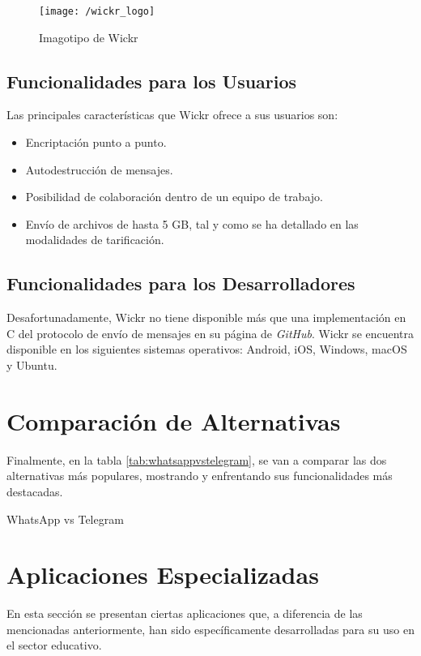 \begin{figure}[!h]
	\begin{center}
		\texttt{[image: /wickr\_logo]}
		\caption{Imagotipo de Wickr}
		\label{fig:wickr}
	\end{center}
\end{figure}

\subsection{Funcionalidades para los Usuarios}
Las principales características que Wickr ofrece a sus usuarios son:

\begin{itemize}
	\item Encriptación punto a punto.
	\item Autodestrucción de mensajes.
	\item Posibilidad de colaboración dentro de un equipo de trabajo.
	\item Envío de archivos de hasta 5 \acs{GB}, tal y como se ha detallado en las modalidades de tarificación.
\end{itemize}

\subsection{Funcionalidades para los Desarrolladores}
Desafortunadamente, Wickr no tiene disponible más que una implementación en C del protocolo de envío de mensajes en su página de \textit{GitHub}. Wickr se encuentra disponible en los siguientes sistemas operativos: Android, iOS, Windows, macOS y Ubuntu.

\newpage

\section{Comparación de Alternativas}
Finalmente, en la tabla \ref{tab:whatsappvstelegram}, se van a comparar las dos alternativas más populares, mostrando y enfrentando sus funcionalidades más destacadas.

\begin{table}[hp]
	\centering
	{\small
		
	}
	\caption[WhatsApp vs Telegram]
	{WhatsApp vs Telegram}
	\label{tab:whatsappvstelegram}
\end{table}

\newpage

\section{Aplicaciones Especializadas}
En esta sección se presentan ciertas aplicaciones que, a diferencia de las mencionadas anteriormente, han sido específicamente desarrolladas para su uso en el sector educativo.

